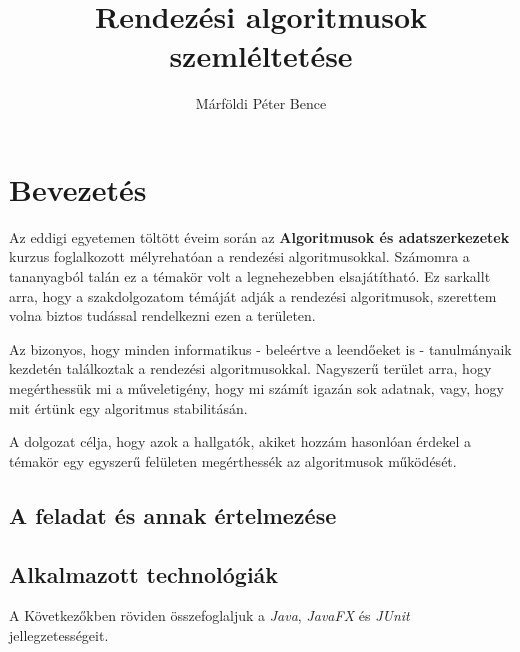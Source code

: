 \documentclass{elteikthesis}
\title{Rendezési algoritmusok szemléltetése}
\author{Márföldi Péter Bence}
\begin{document}
\frontmatter

	\maketitle
	\renewcommand{\thepage}{\Roman{page}}
	\tableofcontents\thispagestyle{fancy}
	
\mainmatter
	\pagestyle{fancy}

\chapter{Bevezetés} 
 Az eddigi egyetemen töltött éveim során az \textbf{Algoritmusok és adatszerkezetek} kurzus foglalkozott mélyrehatóan a rendezési algoritmusokkal. Számomra a tananyagból talán ez a témakör volt a legnehezebben elsajátítható. Ez sarkallt arra, hogy a szakdolgozatom témáját adják a rendezési algoritmusok, szerettem volna biztos tudással rendelkezni ezen a területen.\par
 Az bizonyos, hogy minden informatikus - beleértve a leendőeket is - tanulmányaik kezdetén találkoztak a rendezési algoritmusokkal. Nagyszerű terület arra, hogy megérthessük mi a műveletigény, hogy mi számít igazán sok adatnak, vagy, hogy mit értünk egy algoritmus stabilitásán.\par
 A dolgozat célja, hogy azok a hallgatók, akiket hozzám hasonlóan érdekel a témakör egy egyszerű felületen megérthessék az algoritmusok működését.

\section{A feladat és annak értelmezése} 

\section{Alkalmazott technológiák}
A Következőkben röviden összefoglaljuk a \emph{Java}\cite{Java}, \emph{JavaFX}\cite{JavaFX} és \emph{JUnit}\cite{JUnit} jellegzetességeit.
\end{document}
